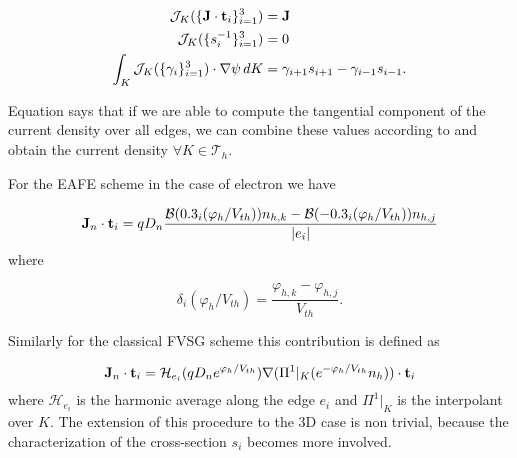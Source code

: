 \begin{align}
\mathcal{J}_K(\{\mathbf{J}\cdot \mathbf{t}_i\}_{i=1}^3) & = \mathbf{J} \label{eq: map is current} \\
 \mathcal{J}_K(\{s_i^{-1}\}_{i=1}^3) & = 0 \\
 \int_K \mathcal{J}_K(\{\gamma_i\}_{i=1}^3) \cdot \nabla \psi \, dK & = \gamma_{i+1}s_{i+1} - \gamma_{i-1}s_{i-1}.
\end{align}
 
Equation  says that if we are able to compute the tangential component of the current density over all edges, we can combine these values according to  and obtain the current density $\forall K \in \mathcal{T}_h$.
 
For the EAFE scheme in the case of electron we have
 
\begin{equation}
\label{eq: EAFE edge formula}
\small
\mathbf{J}_n\cdot \mathbf{t}_i = qD_n  \dfrac{\mathcal{B}(0.3_i(\varphi_h / V_{th}))n_{h,k} -  \mathcal{B}(-0.3_i(\varphi_h / V_{th}))n_{h,j}}{|e_i|}
\end{equation}
where 

\begin{equation}
\delta_i(\varphi_h/V_{th}) = \dfrac{\varphi_{h,k}-\varphi_{h,j}}{V_{th}}.
\end{equation}

Similarly for the classical FVSG scheme this contribution is defined as

\begin{equation}
\mathbf{J}_n\cdot \mathbf{t}_i = \mathcal{H}_{e_i}(qD_n e^{\varphi_h/V_{th}}) \nabla (\Pi^1|_K(e^{-\varphi_h / V_{th}}n_h)) \cdot \mathbf{t}_i
\end{equation}
where $\mathcal{H}_{e_i}$ is the harmonic average along the edge $e_i$ and $\Pi^1|_K$ is the interpolant over $K$.
The extension of this procedure to the 3D case is non trivial, because the characterization of the cross-section $s_i$ becomes more involved.

